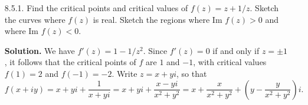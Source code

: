 \documentclass[9pt]{article}
\begin{document}
\begin{enumerate}
   \item[8.5.1.]  Find the critical points and critical values of
                  $f(z) = z + 1/z$. Sketch the curves where $f(z)$ is real.
                  Sketch the regions where Im $f(z) > 0$ and where
                  Im $f(z) < 0$.
                  
      \textbf{Solution.} We have $f'(z) = 1 - 1/z^2$. Since $f'(z) = 0$ if and
      only if $z = \pm1$, it follows that the critical points of $f$ are
      $1$ and $-1$, with critical values $f(1) = 2$ and $f(-1) = -2$. Write
      $z = x + yi$, so that
      $$f(x + iy) = x + yi + \frac{1}{x+yi} = x + yi + \frac{x-yi}{x^2+y^2} =
        x + \frac{x}{x^2+y^2} + \left(y - \frac{y}{x^2+y^2}\right)i.$$
        

\end{enumerate}
\end{document}
